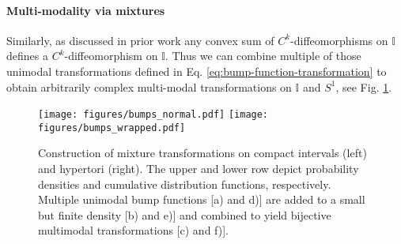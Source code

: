 \documentclass{article}
\newcommand{\TODO}[1]{{\color{orange} \textbf{TODO:} #1 }}
\begin{document}
\paragraph{Multi-modality via mixtures}
Similarly, as discussed in prior work \cite{ho2019flow++, rezende2020normalizing} any convex sum of $C^{k}$-diffeomorphisms on $\mathbb{I}$ defines a $C^{k}$-diffeomorphism on $\mathbb{I}$. Thus we can combine multiple of those unimodal transformations defined in Eq. \eqref{eq:bump-function-transformation} to obtain arbitrarily complex multi-modal transformations on $\mathbb{I}$ and $S^1$, see Fig. \ref{fig:schema}.
\begin{figure}
    \centering
    \texttt{[image: figures/bumps\_normal.pdf]}
    \texttt{[image: figures/bumps\_wrapped.pdf]}
    \caption{Construction of mixture transformations on compact intervals (left) and hypertori (right). The upper and lower row depict probability densities and cumulative distribution functions, respectively. Multiple unimodal bump functions [a) and d)] are added to a small but finite density [b) and e)] and combined to yield bijective multimodal transformations [c) and f)].}
    \label{fig:schema}
\end{figure}

\end{document}

